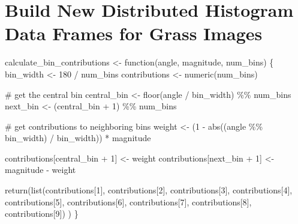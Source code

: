 \documentclass[
  letterpaper,
  DIV=11,
  numbers=noendperiod]{scrreprt}
\newenvironment{Shaded}{\begin{snugshade}}{\end{snugshade}}
\newcommand{\CommentTok}[1]{\textcolor[rgb]{0.37,0.37,0.37}{#1}}
\newcommand{\ControlFlowTok}[1]{\textcolor[rgb]{0.00,0.23,0.31}{#1}}
\newcommand{\DecValTok}[1]{\textcolor[rgb]{0.68,0.00,0.00}{#1}}
\newcommand{\FunctionTok}[1]{\textcolor[rgb]{0.28,0.35,0.67}{#1}}
\newcommand{\NormalTok}[1]{\textcolor[rgb]{0.00,0.23,0.31}{#1}}
\newcommand{\OtherTok}[1]{\textcolor[rgb]{0.00,0.23,0.31}{#1}}
\newcommand{\SpecialCharTok}[1]{\textcolor[rgb]{0.37,0.37,0.37}{#1}}
\begin{document}
\section{Build New Distributed Histogram Data Frames for Grass
Images}\label{build-new-distributed-histogram-data-frames-for-grass-images}

\begin{Shaded}
\begin{Highlighting}[]
\NormalTok{calculate\_bin\_contributions }\OtherTok{\textless{}{-}} \ControlFlowTok{function}\NormalTok{(angle, magnitude, num\_bins) \{}
\NormalTok{  bin\_width }\OtherTok{\textless{}{-}} \DecValTok{180} \SpecialCharTok{/}\NormalTok{ num\_bins}
\NormalTok{  contributions }\OtherTok{\textless{}{-}} \FunctionTok{numeric}\NormalTok{(num\_bins)}
  
  \CommentTok{\# get the central bin}
\NormalTok{  central\_bin }\OtherTok{\textless{}{-}} \FunctionTok{floor}\NormalTok{(angle }\SpecialCharTok{/}\NormalTok{ bin\_width) }\SpecialCharTok{\%\%}\NormalTok{ num\_bins}
\NormalTok{  next\_bin }\OtherTok{\textless{}{-}}\NormalTok{ (central\_bin }\SpecialCharTok{+} \DecValTok{1}\NormalTok{) }\SpecialCharTok{\%\%}\NormalTok{ num\_bins}
  
  \CommentTok{\# get contributions to neighboring bins}
\NormalTok{  weight }\OtherTok{\textless{}{-}}\NormalTok{ (}\DecValTok{1} \SpecialCharTok{{-}} \FunctionTok{abs}\NormalTok{((angle }\SpecialCharTok{\%\%}\NormalTok{ bin\_width) }\SpecialCharTok{/}\NormalTok{ bin\_width)) }\SpecialCharTok{*}\NormalTok{ magnitude}
  
\NormalTok{  contributions[central\_bin }\SpecialCharTok{+} \DecValTok{1}\NormalTok{] }\OtherTok{\textless{}{-}}\NormalTok{ weight}
\NormalTok{  contributions[next\_bin }\SpecialCharTok{+} \DecValTok{1}\NormalTok{] }\OtherTok{\textless{}{-}}\NormalTok{ magnitude }\SpecialCharTok{{-}}\NormalTok{ weight}
  
  \FunctionTok{return}\NormalTok{(}\FunctionTok{list}\NormalTok{(contributions[}\DecValTok{1}\NormalTok{],}
\NormalTok{         contributions[}\DecValTok{2}\NormalTok{],}
\NormalTok{         contributions[}\DecValTok{3}\NormalTok{],}
\NormalTok{         contributions[}\DecValTok{4}\NormalTok{],}
\NormalTok{         contributions[}\DecValTok{5}\NormalTok{],}
\NormalTok{         contributions[}\DecValTok{6}\NormalTok{],}
\NormalTok{         contributions[}\DecValTok{7}\NormalTok{],}
\NormalTok{         contributions[}\DecValTok{8}\NormalTok{],}
\NormalTok{         contributions[}\DecValTok{9}\NormalTok{])}
\NormalTok{         )}
\NormalTok{\}}
\end{Highlighting}
\end{Shaded}
\end{document}
